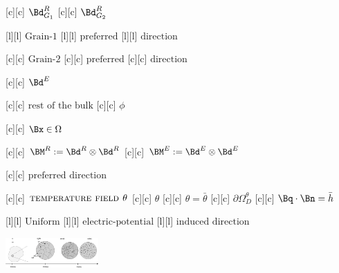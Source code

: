 [c][c] {$\Bd^{R}_{G_1}$}
[c][c] {$\Bd^{R}_{G_2}$}

[l][l] {$\text{Grain-1}$}
[l][l] {$\text{preferred}$}
[l][l] {$\text{direction}$}

[c][c] {$\text{Grain-2}$}
[c][c] {$\text{preferred}$}
[c][c] {$\text{direction}$}

[c][c] {$\Bd^{E}$}

[c][c] {$\text{rest of the bulk}$}
[c][c] {$\phi$}

[c][c] {$\Bx \in \Omega$}

[c][c] {$\BM^{R} := \Bd^{R} \otimes \Bd^{R}$}
[c][c] {$\BM^{E} := \Bd^{E} \otimes \Bd^{E}$}

[c][c] {$\text{preferred direction}$}

[c][c] {$\textsc{temperature field } \theta$}
[c][c] {$\theta$}
[c][c] {$\theta = \bar{\theta}$}
[c][c] {$\partial\Omega^{\theta}_{D}$}
[c][c] {$\Bq\cdot\Bn = \bar{h}$}

[l][l] {$\text{Uniform}$}
[l][l] {$\text{electric-potential}$}
[l][l] {$\text{induced direction}$}

\includegraphics[width=0.265\textwidth]{dendrite_2parts_nosample_split.eps}
